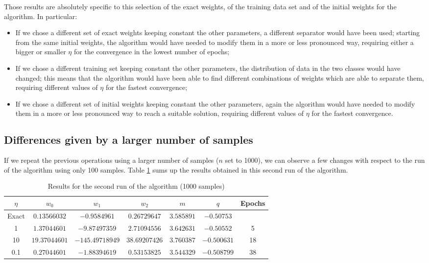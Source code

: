 \documentclass[letterpaper,headings=standardclasses]{scrartcl}
\begin{document}
Those results are absolutely specific to this selection of the exact weights, of the training data set and of the initial weights for the algorithm. In particular:

\begin{itemize}

\item If we chose a different set of exact weights keeping constant the other parameters, a different separator would have been used; starting from the same initial weights, the algorithm would have needed to modify them in a more or less pronounced way, requiring either a bigger or smaller $\eta$ for the convergence in the lowest number of epochs;

\item If we chose a different training set keeping constant the other parameters, the distribution of data in the two classes would have changed; this means that the algorithm would have been able to find different combinations of weights which are able to separate them, requiring different values of $\eta$ for the fastest convergence;

\item If we chose a different set of initial weights keeping constant the other parameters, again the algorithm would have needed to modify them in a more or less pronounced way to reach a suitable solution, requiring different values of $\eta$ for the fastest convergence.

\end{itemize}

\subsection{Differences given by a larger number of samples}

If we repeat the previous operations using a larger number of samples ($n$ set to 1000), we can observe a few changes with respect to the run of the algorithm using only 100 samples. Table \ref{results_1000} sums up the results obtained in this second run of the algorithm.

\begin{table}[h]
\centering
\begin{tabular}{|c|c|c|c|c|c|c|}
\hline
$\eta$ & $w_0$ & $w_1$ & $w_2$ & $m$ & $q$ & Epochs \\ \hline
Exact & $0.13566032$ & $-0.9584961$ & $0.26729647$ & $3.585891$ & $-0.50753$ & \\ \hline
1 & $1.37044601$ & $-9.87497359$ & $2.71094556$ & $3.642631$ & $-0.50552$ & 5 \\ \hline
10 & $19.37044601$ & $-145.49718949$ & $38.69207426$ & $3.760387$ & $-0.500631$ & 18 \\ \hline
0.1 & $0.27044601$ & $-1.88394619$ & $0.53153825$ & $3.544329$ & $-0.508799$ & 38 \\ \hline
\end{tabular}
\caption{Results for the second run of the algorithm (1000 samples)}
\label{results_1000}
\end{table}
\end{document}
